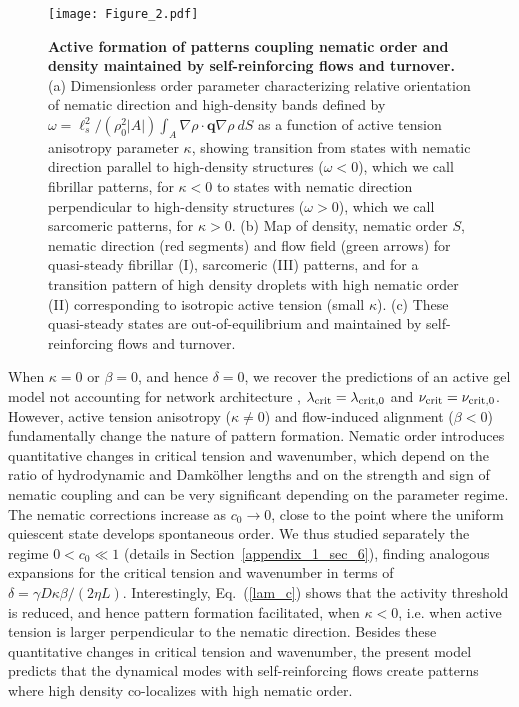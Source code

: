 	
\begin{figure}
	\centering
	\texttt{[image: Figure\_2.pdf]}
	\caption{{\bf Active formation of patterns coupling nematic order and density maintained by self-reinforcing flows and turnover.} (a) Dimensionless order parameter characterizing relative orientation of nematic direction and high-density bands defined by $\omega = {\ell_s^2}/{(\rho_0^2\vert A\vert)}\int_A \nabla\rho\cdot \boldsymbol{q} \nabla\rho~dS$ as a function of active tension anisotropy parameter $\kappa$, showing transition from states with nematic direction parallel to high-density structures ($\omega<0$), which we call fibrillar patterns, for $\kappa<0$ to states with nematic direction perpendicular to high-density structures  ($\omega>0$), which we call sarcomeric patterns, for $\kappa>0$. (b) Map of density, nematic order $S$, nematic direction (red segments) and flow field (green arrows) for quasi-steady fibrillar (I), sarcomeric (III) patterns, and for a transition pattern of high density droplets with high nematic order (II) corresponding to isotropic active tension (small $\kappa$). (c) These quasi-steady states are out-of-equilibrium and maintained by self-reinforcing flows and turnover.}
	\label{fig4.2}
\end{figure} 



When  $\kappa = 0$ or $\beta =0$, and hence $\delta = 0$, we recover the predictions of an active gel model not accounting for network architecture \cite{hannezo2015}, $\lambda_{\rm crit} = \lambda_{\rm crit,0}$ and $\nu_{\rm crit} = \nu_{\rm crit,0}$. However,  active tension anisotropy ($\kappa \ne 0$) and flow-induced alignment ($\beta <0$) fundamentally change the nature of pattern formation. Nematic order introduces  quantitative changes in critical tension and wavenumber, which depend on the ratio of hydrodynamic and Damk\"olher lengths and on the strength and sign of nematic coupling and can be very significant depending on the parameter regime. The nematic corrections increase as $c_0 \rightarrow 0$, close to the point where the uniform quiescent state develops spontaneous order. We thus studied separately the regime $0<c_0 \ll 1$ (details in Section~\ref{appendix_1_sec_6}), finding analogous expansions for the critical tension and wavenumber in terms of $\delta = \gamma D \kappa \beta /(2\eta L)$. Interestingly, Eq.~(\ref{lam_c}) shows that the activity threshold is reduced, and hence pattern formation facilitated, when $\kappa<0$, i.e. when active tension is larger perpendicular to the nematic direction. Besides these quantitative changes in critical tension and wavenumber, the present model predicts that the dynamical modes with self-reinforcing flows create patterns where high density co-localizes with high nematic order.



